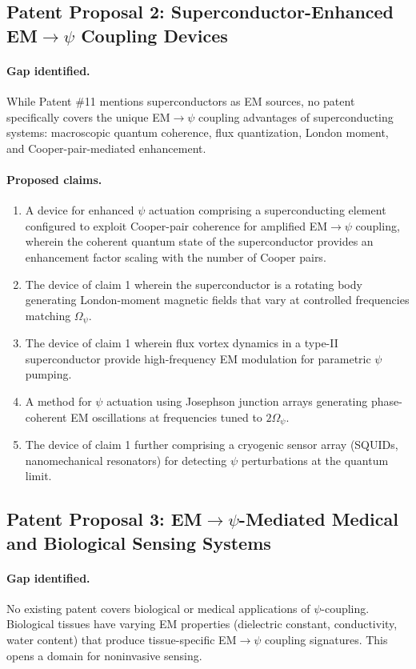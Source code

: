 \documentclass[aps,prd,twocolumn,superscriptaddress,floatfix,nofootinbib]{revtex4-2}
\newcommand{\Opsi}{\Omega_\psi}
\begin{document}
\subsection{Patent Proposal 2: Superconductor-Enhanced EM$\to\psi$
Coupling Devices}

\paragraph{Gap identified.}
While Patent \#11 mentions superconductors as EM sources, no patent
specifically covers the unique EM$\to\psi$ coupling advantages of
superconducting systems: macroscopic quantum coherence, flux
quantization, London moment, and Cooper-pair-mediated enhancement.

\paragraph{Proposed claims.}
\begin{enumerate}[nosep]
\item A device for enhanced $\psi$ actuation comprising a
superconducting element configured to exploit Cooper-pair coherence
for amplified EM$\to\psi$ coupling, wherein the coherent quantum state
of the superconductor provides an enhancement factor scaling with
the number of Cooper pairs.
\item The device of claim 1 wherein the superconductor is a rotating
body generating London-moment magnetic fields that vary at controlled
frequencies matching $\Opsi$.
\item The device of claim 1 wherein flux vortex dynamics in a
type-II superconductor provide high-frequency EM modulation for
parametric $\psi$ pumping.
\item A method for $\psi$ actuation using Josephson junction arrays
generating phase-coherent EM oscillations at frequencies tuned to
$2\Opsi$.
\item The device of claim 1 further comprising a cryogenic sensor
array (SQUIDs, nanomechanical resonators) for detecting $\psi$
perturbations at the quantum limit.
\end{enumerate}

\subsection{Patent Proposal 3: EM$\to\psi$-Mediated Medical
and Biological Sensing Systems}

\paragraph{Gap identified.}
No existing patent covers biological or medical applications of
$\psi$-coupling. Biological tissues have varying EM properties
(dielectric constant, conductivity, water content) that produce
tissue-specific EM$\to\psi$ coupling signatures. This opens a
domain for noninvasive sensing.
\end{document}

